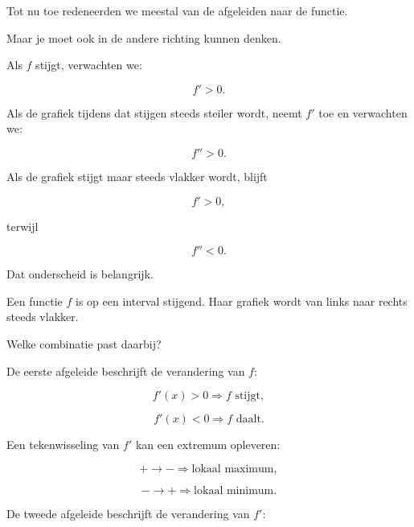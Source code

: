 \documentclass{ximera}
\begin{document}


Tot nu toe redeneerden we meestal van de afgeleiden naar de functie.

Maar je moet ook in de andere richting kunnen denken.

Als $f$ stijgt, verwachten we:

\[
f'>0.
\]

Als de grafiek tijdens dat stijgen steeds steiler wordt, neemt $f'$
toe en verwachten we:

\[
f''>0.
\]

Als de grafiek stijgt maar steeds vlakker wordt, blijft

\[
f'>0,
\]

terwijl

\[
f''<0.
\]

Dat onderscheid is belangrijk.

\begin{oefening}{\oefU\ESS}

Een functie $f$ is op een interval stijgend. Haar grafiek wordt van
links naar rechts steeds vlakker.

Welke combinatie past daarbij?

\begin{multipleChoice}
\end{multipleChoice}

\end{oefening}








De eerste afgeleide beschrijft de verandering van $f$:

\[
f'(x)>0
\Rightarrow
f \text{ stijgt},
\]

\[
f'(x)<0
\Rightarrow
f \text{ daalt}.
\]

Een tekenwisseling van $f'$ kan een extremum opleveren:

\[
+\to-
\Rightarrow
\text{lokaal maximum},
\]

\[
-\to+
\Rightarrow
\text{lokaal minimum}.
\]

De tweede afgeleide beschrijft de verandering van $f'$:
\end{document}
